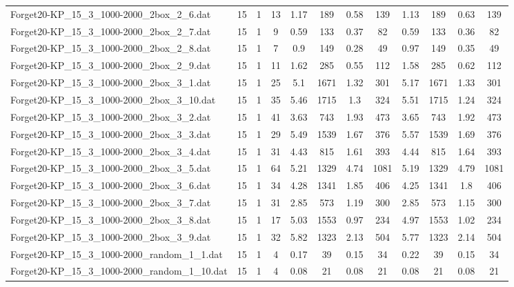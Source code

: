 \begin{sidewaystable}[!ht]
{\begin{tabular}{lccccccccccc}
Forget20-KP\_15\_3\_1000-2000\_2box\_2\_6.dat & 15 & 1 & 13 & 1.17 & 189 &  \textcolor{blue2}{0.58} & 139 & 1.13 & 189 & 0.63 & 139 \\
Forget20-KP\_15\_3\_1000-2000\_2box\_2\_7.dat & 15 & 1 & 9 & 0.59 & 133 & 0.37 & 82 & 0.59 & 133 &  \textcolor{blue2}{0.36} & 82 \\
Forget20-KP\_15\_3\_1000-2000\_2box\_2\_8.dat & 15 & 1 & 7 & 0.9 & 149 &  \textcolor{blue2}{0.28} & 49 & 0.97 & 149 & 0.35 & 49 \\
Forget20-KP\_15\_3\_1000-2000\_2box\_2\_9.dat & 15 & 1 & 11 & 1.62 & 285 &  \textcolor{blue2}{0.55} & 112 & 1.58 & 285 & 0.62 & 112 \\
Forget20-KP\_15\_3\_1000-2000\_2box\_3\_1.dat & 15 & 1 & 25 & 5.1 & 1671 &  \textcolor{blue2}{1.32} & 301 & 5.17 & 1671 & 1.33 & 301 \\
Forget20-KP\_15\_3\_1000-2000\_2box\_3\_10.dat & 15 & 1 & 35 & 5.46 & 1715 & 1.3 & 324 & 5.51 & 1715 &  \textcolor{blue2}{1.24} & 324 \\
Forget20-KP\_15\_3\_1000-2000\_2box\_3\_2.dat & 15 & 1 & 41 & 3.63 & 743 & 1.93 & 473 & 3.65 & 743 & 1.92 & 473 \\
Forget20-KP\_15\_3\_1000-2000\_2box\_3\_3.dat & 15 & 1 & 29 & 5.49 & 1539 &  \textcolor{blue2}{1.67} & 376 & 5.57 & 1539 & 1.69 & 376 \\
Forget20-KP\_15\_3\_1000-2000\_2box\_3\_4.dat & 15 & 1 & 31 & 4.43 & 815 &  \textcolor{blue2}{1.61} & 393 & 4.44 & 815 & 1.64 & 393 \\
Forget20-KP\_15\_3\_1000-2000\_2box\_3\_5.dat & 15 & 1 & 64 & 5.21 & 1329 &  \textcolor{blue2}{4.74} & 1081 & 5.19 & 1329 & 4.79 & 1081 \\
Forget20-KP\_15\_3\_1000-2000\_2box\_3\_6.dat & 15 & 1 & 34 & 4.28 & 1341 & 1.85 & 406 & 4.25 & 1341 & 1.8 & 406 \\
Forget20-KP\_15\_3\_1000-2000\_2box\_3\_7.dat & 15 & 1 & 31 & 2.85 & 573 & 1.19 & 300 & 2.85 & 573 &  \textcolor{blue2}{1.15} & 300 \\
Forget20-KP\_15\_3\_1000-2000\_2box\_3\_8.dat & 15 & 1 & 17 & 5.03 & 1553 & 0.97 & 234 & 4.97 & 1553 & 1.02 & 234 \\
Forget20-KP\_15\_3\_1000-2000\_2box\_3\_9.dat & 15 & 1 & 32 & 5.82 & 1323 &  \textcolor{blue2}{2.13} & 504 & 5.77 & 1323 & 2.14 & 504 \\
Forget20-KP\_15\_3\_1000-2000\_random\_1\_1.dat & 15 & 1 & 4 & 0.17 & 39 &  \textcolor{blue2}{0.15} & 34 & 0.22 & 39 &  \textcolor{blue2}{0.15} & 34 \\
Forget20-KP\_15\_3\_1000-2000\_random\_1\_10.dat & 15 & 1 & 4 &  \textcolor{blue2}{0.08} & 21 &  \textcolor{blue2}{0.08} & 21 &  \textcolor{blue2}{0.08} & 21 &  \textcolor{blue2}{0.08} & 21 \\

\end{tabular}}
\end{sidewaystable}
